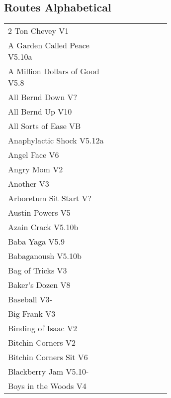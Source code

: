 \twocolumn
{}
\begin{flushleft}
\section{Routes Alphabetical}
\begin{center}
\begin{supertabular}{p{0.65\linewidth}r}
2 Ton Chevey V1 & \pageref{rt:2 Ton Chevey} \\
A Garden Called Peace V5.10a & \pageref{rt:A Garden Called Peace} \\
A Million Dollars of Good V5.8 & \pageref{rt:A Million Dollars of Good} \\
All Bernd Down V? & \pageref{rt:All Bernd Down} \\
All Bernd Up V10 & \pageref{rt:All Bernd Up} \\
All Sorts of Ease VB & \pageref{rt:All Sorts of Ease} \\
Anaphylactic Shock V5.12a & \pageref{rt:Anaphylactic Shock} \\
Angel Face V6 & \pageref{rt:Angel Face} \\
Angry Mom V2 & \pageref{rt:Angry Mom} \\
Another V3 & \pageref{rt:Another} \\
Arboretum Sit Start V? & \pageref{vr:Arboretum Sit Start} \\
Austin Powers V5 & \pageref{rt:Austin Powers} \\
Azain Crack V5.10b & \pageref{rt:Azain Crack} \\
Baba Yaga V5.9 & \pageref{rt:Baba Yaga} \\
Babaganoush V5.10b & \pageref{rt:Babaganoush} \\
Bag of Tricks V3 & \pageref{vr:Bag of Tricks} \\
Baker's Dozen V8 & \pageref{vr:Baker's Dozen} \\
Baseball V3- & \pageref{rt:Baseball} \\
Big Frank V3 & \pageref{rt:Big Frank} \\
Binding of Isaac V2 & \pageref{rt:Binding of Isaac} \\
Bitchin Corners V2 & \pageref{rt:Bitchin Corners} \\
Bitchin Corners Sit V6 & \pageref{vr:Bitchin Corners Sit} \\
Blackberry Jam V5.10- & \pageref{rt:Blackberry Jam} \\
Boys in the Woods V4 & \pageref{rt:Boys in the Woods} \\

\end{supertabular}
\end{center}
\end{flushleft}

